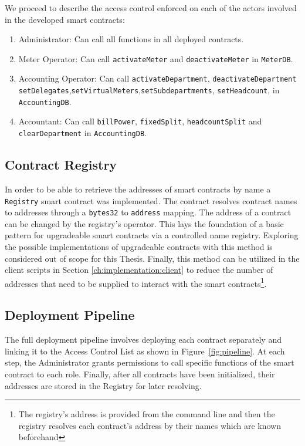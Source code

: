 We proceed to describe the access control enforced on each of the actors involved in the developed smart contracts:
\begin{enumerate}
    \item Administrator: Can call all functions in all deployed contracts.
    \item Meter Operator: Can call \texttt{activateMeter} and \texttt{deactivateMeter} in \texttt{MeterDB}.
    \item Accounting Operator: Can call \texttt{activateDepartment}, \texttt{deactivateDepartment} \texttt{setDelegates},\texttt{setVirtualMeters},\texttt{setSubdepartments},   \texttt{setHeadcount}, in \texttt{AccountingDB}.
    \item Accountant: Can call \texttt{billPower}, \texttt{fixedSplit}, \texttt{headcountSplit} and \texttt{clearDepartment} in \texttt{AccountingDB}.
\end{enumerate}

\subsection{Contract Registry} 

In order to be able to retrieve the addresses of smart contracts by name a \texttt{Registry} smart contract was implemented. The contract resolves contract names to addresses through a \texttt{bytes32} to \texttt{address} mapping. The address of a contract can be changed by the registry's operator. This lays the foundation of a basic pattern for upgradeable smart contracts via a controlled name registry. Exploring the possible implementations of upgradeable contracts with this method is considered out of scope for this Thesis. Finally, this method can be utilized in the client scripts in Section \ref{ch:implementation:client} to reduce the number of addresses that need to be supplied to interact with the smart contracts\footnote{The registry's address is provided from the command line and then the registry resolves each contract's address by their names which are known beforehand}.

\subsection{Deployment Pipeline}

The full deployment pipeline involves deploying each contract separately and linking it to the Access Control List as shown in Figure~\ref{fig:pipeline}. At each step, the Administrator grants permissions to call specific functions of the smart contract to each role. Finally, after all contracts have been initialized, their addresses are stored in the Registry for later resolving.


